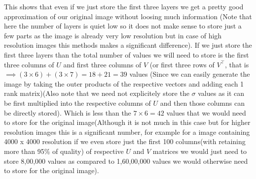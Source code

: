 \documentclass{article}
\begin{document}
This shows that even if we just store the first three layers we get a pretty good approximation of our original image without loosing much information (Note that here the number of layers is quiet low so it does not make sense to store just a few parts as the image is already very low resolution but in case of high resolution images this methods makes a significant difference). If we just store the first three layers than the total number of values we will need to store is the first three columns of $U$ and first three columns of $V$ (or first three rows of $V^{\top}$, that is $\implies (3 \times 6) + (3 \times 7) = 18 + 21 = 39$ values (Since we can easily generate the image by taking the outer products of the respective vectors and adding each 1 rank matrix)(Also note that we need not explicitely store the $\sigma$ values as it can be first multiplied into the respective columns of $U$ and then those columns can be directly stored). Which is less than the $7 \times 6 = 42$ values that we would need to store for the original image(Although it is not much in this case but for higher resolution images this is a significant number, for example for a image containing 4000 x 4000 resolution if we even store just the first 100 columns(with retaining more than 95\% of quality) of respective $U$ and $V$ matrices we would just need to store 8,00,000 values as compared to 1,60,00,000 values we would otherwise need to store for the original image).
\end{document}

